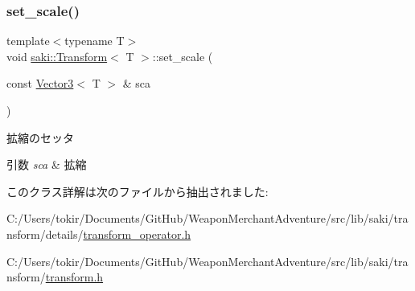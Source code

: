 \subsubsection{\texorpdfstring{set\+\_\+scale()}{set\_scale()}}
{\footnotesize\ttfamily template$<$typename T$>$ \\
void \mbox{\hyperlink{classsaki_1_1_transform}{saki\+::\+Transform}}$<$ T $>$\+::set\+\_\+scale (\begin{DoxyParamCaption}\item[{const \mbox{\hyperlink{classsaki_1_1_vector3}{Vector3}}$<$ T $>$ \&}]{sca }\end{DoxyParamCaption})\hspace{0.3cm}{\ttfamily [inline]}}



拡縮のセッタ 


\begin{DoxyParams}{引数}
{\em sca} & 拡縮 \\
\hline
\end{DoxyParams}


このクラス詳解は次のファイルから抽出されました\+:\begin{DoxyCompactItemize}
\item 
C\+:/\+Users/tokir/\+Documents/\+Git\+Hub/\+Weapon\+Merchant\+Adventure/src/lib/saki/transform/details/\mbox{\hyperlink{transform__operator_8h}{transform\+\_\+operator.\+h}}\item 
C\+:/\+Users/tokir/\+Documents/\+Git\+Hub/\+Weapon\+Merchant\+Adventure/src/lib/saki/transform/\mbox{\hyperlink{transform_8h}{transform.\+h}}\end{DoxyCompactItemize}
